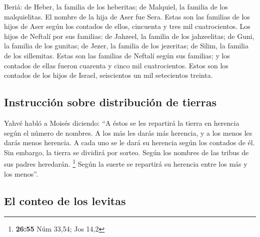 \begin{paracol}{2}
Beriá: de Heber, la familia de los heberitas; de Malquiel, la familia de
los malquielitas.  El nombre de la hija de Aser fue Sera.
 Estas son las familias de los hijos de Aser según los
contados de ellos, cincuenta y tres mil cuatrocientos. 
Los hijos de Neftalí por sus familias: de Jahzeel, la familia de los
jahzeelitas; de Guni, la familia de los gunitas;  de
Jezer, la familia de los jezeritas; de Silim, la familia de los
sillemitas.  Estas son las familias de Neftalí según sus
familias; y los contados de ellas fueron cuarenta y cinco mil
cuatrocientos.  Estos son los contados de los hijos de
Israel, seiscientos un mil setecientos treinta.

\hypertarget{instrucciuxf3n-sobre-distribuciuxf3n-de-tierras}{%
\subsection{Instrucción sobre distribución de
tierras}\label{instrucciuxf3n-sobre-distribuciuxf3n-de-tierras}}

 Yahvé habló a Moisés diciendo:  ``A éstos
se les repartirá la tierra en herencia según el número de nombres.
 A los más les darás más herencia, y a los menos les
darás menos herencia. A cada uno se le dará su herencia según los
contados de él.  Sin embargo, la tierra se dividirá por
sorteo. Según los nombres de las tribus de sus padres heredarán.
\footnote{\textbf{26:55} Núm 33,54; Jos 14,2}  Según la
suerte se repartirá su herencia entre los más y los menos''.

\hypertarget{el-conteo-de-los-levitas}{%
\subsection{El conteo de los levitas}\label{el-conteo-de-los-levitas}}


\end{paracol}
